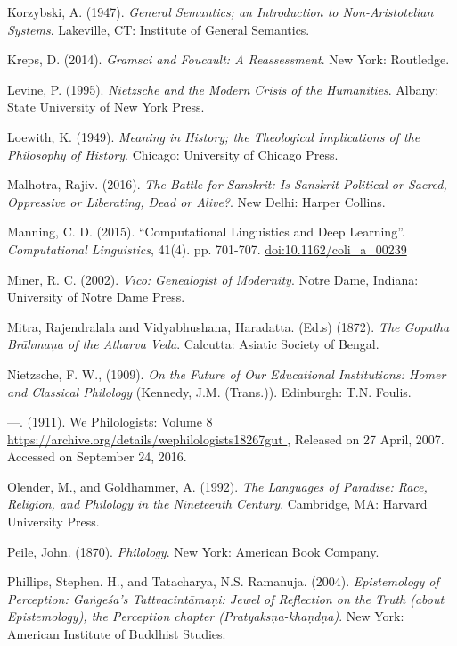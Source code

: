 \begin{thebibliography}{99}
  Korzybski, A. (1947). \textit{General Semantics; an Introduction to Non-Aristotelian Systems}. Lakeville, CT: Institute of General Semantics.

  Kreps, D. (2014). \textit{Gramsci and Foucault: A Reassessment}. New York: Routledge.

  Levine, P. (1995). \textit{Nietzsche and the Modern Crisis of the Humanities}. Albany: State University of New York Press.

  Loewith, K. (1949). \textit{Meaning in History; the Theological Implications of the Philosophy of History}. Chicago: University of Chicago Press.

  Malhotra, Rajiv. (2016). \textit{The Battle for Sanskrit: Is Sanskrit Political or Sacred, Oppressive or Liberating, Dead or Alive?}. New Delhi: Harper Collins.

  Manning, C. D. (2015). “Computational Linguistics and Deep Learning”. \textit{Computational Linguistics}, 41(4). pp. 701-707. \url{doi:10.1162/coli_a_00239}

  Miner, R. C. (2002). \textit{Vico: Genealogist of Modernity}. Notre Dame, Indiana: University of Notre Dame Press.

  Mitra, Rajendralala and Vidyabhushana, Haradatta. (Ed.s) (1872). \textit{The Gopatha Brāhmaṇa of the Atharva Veda}. Calcutta: Asiatic Society of Bengal.

  Nietzsche, F. W., (1909). \textit{On the Future of Our Educational Institutions: Homer and Classical Philology} (Kennedy, J.M. (Trans.)). Edinburgh: T.N. Foulis.

  —. (1911). We Philologists: Volume 8 \url{ https://archive.org/details/wephilologists18267gut }, Released on 27 April, 2007. Accessed on September 24, 2016.

  Olender, M., and Goldhammer, A. (1992). \textit{The Languages of Paradise: Race, Religion, and Philology in the Nineteenth Century}. Cambridge, MA: Harvard University Press.

  Peile, John. (1870). \textit{Philology}. New York: American Book Company.

  Phillips, Stephen. H., and Tatacharya, N.S. Ramanuja. (2004). \textit{Epistemology of Perception: Gaṅgeśa's Tattvacintāmaṇi: Jewel of Reflection on the Truth (about Epistemology), the Perception chapter (Pratyaksṇa-khaṇdṇa)}. New York: American Institute of Buddhist Studies.


\end{thebibliography}
